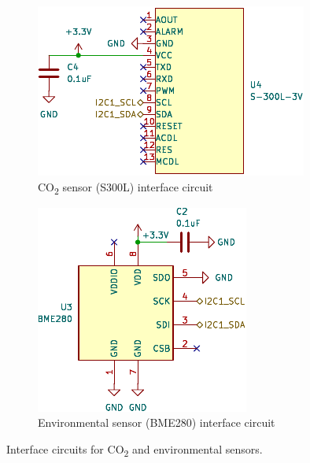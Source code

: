 \documentclass[main]{subfiles}
\begin{document}
\begin{figure}[h]
    \centering
    \begin{subfigure}[b]{0.48\linewidth}
        \centering
        \includegraphics[width=\linewidth]{figures/2/AGV_Multisensor-CO2_S300L.pdf}
        \caption{CO\textsubscript{2} sensor (S300L) interface circuit}
        \label{fig:s300l_circuit}
    \end{subfigure}
    \hfill %
    \begin{subfigure}[b]{0.48\linewidth}
        \centering
        \includegraphics[width=\linewidth]{figures/2/AGV_Multisensor-Env_BME280.pdf}
        \caption{Environmental sensor (BME280) interface circuit}
        \label{fig:bme280_circuit}
    \end{subfigure}
    \caption{Interface circuits for CO\textsubscript{2} and environmental sensors.}
    \label{fig:side_by_side_sensors}
\end{figure}

\end{document}
